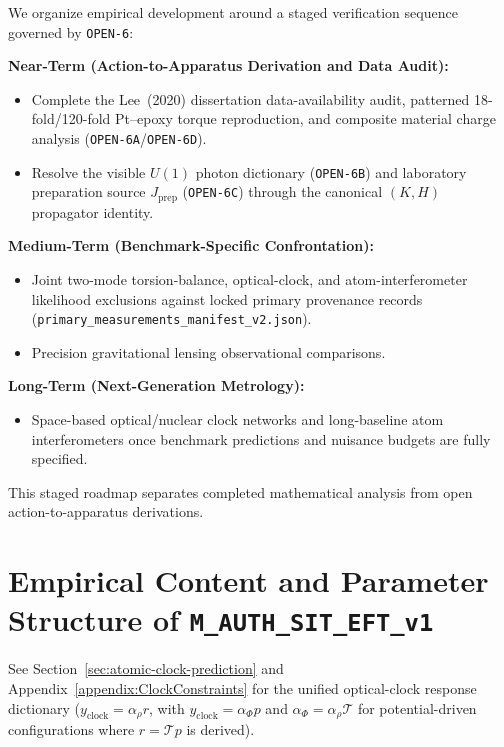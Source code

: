 We organize empirical development around a staged verification sequence governed by \texttt{OPEN-6}:

\textbf{Near-Term (Action-to-Apparatus Derivation and Data Audit):}
\begin{itemize}
    \item Complete the Lee~(2020) dissertation data-availability audit, patterned 18-fold/120-fold Pt--epoxy torque reproduction, and composite material charge analysis (\texttt{OPEN-6A}/\texttt{OPEN-6D}).
    \item Resolve the visible $U(1)$ photon dictionary (\texttt{OPEN-6B}) and laboratory preparation source $J_{\mathrm{prep}}$ (\texttt{OPEN-6C}) through the canonical $(K, H)$ propagator identity.
\end{itemize}

\textbf{Medium-Term (Benchmark-Specific Confrontation):}
\begin{itemize}
    \item Joint two-mode torsion-balance, optical-clock, and atom-interferometer likelihood exclusions against locked primary provenance records (\texttt{primary\_measurements\_manifest\_v2.json}).
    \item Precision gravitational lensing observational comparisons.
\end{itemize}

\textbf{Long-Term (Next-Generation Metrology):}
\begin{itemize}
    \item Space-based optical/nuclear clock networks and long-baseline atom interferometers once benchmark predictions and nuisance budgets are fully specified.
\end{itemize}

This staged roadmap separates completed mathematical analysis from open action-to-apparatus derivations.

\section{Empirical Content and Parameter Structure of \texttt{M\_AUTH\_SIT\_EFT\_v1}}
\label{sec:empirical-content}
See Section~\ref{sec:atomic-clock-prediction} and Appendix~\ref{appendix:ClockConstraints} for the unified optical-clock response dictionary ($y_{\mathrm{clock}} = \alpha_\rho r$, with $y_{\mathrm{clock}} = \alpha_\Phi p$ and $\alpha_\Phi = \alpha_\rho\mathcal{T}$ for potential-driven configurations where $r = \mathcal{T} p$ is derived).

